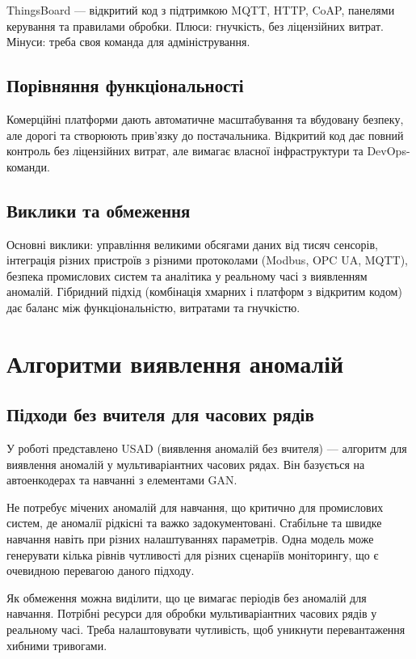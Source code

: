 ThingsBoard --- відкритий код з підтримкою MQTT, HTTP, CoAP, панелями керування та правилами обробки. Плюси: гнучкість, без ліцензійних витрат. Мінуси: треба своя команда для адміністрування.

\subsection{Порівняння функціональності}

Комерційні платформи дають автоматичне масштабування та вбудовану безпеку, але дорогі та створюють прив'язку до постачальника. Відкритий код дає повний контроль без ліцензійних витрат, але вимагає власної інфраструктури та DevOps-команди.

\subsection{Виклики та обмеження}

Основні виклики: управління великими обсягами даних від тисяч сенсорів, інтеграція різних пристроїв з різними протоколами (Modbus, OPC UA, MQTT), безпека промислових систем та аналітика у реальному часі з виявленням аномалій. Гібридний підхід (комбінація хмарних і платформ з відкритим кодом) дає баланс між функціональністю, витратами та гнучкістю.


\section{Алгоритми виявлення аномалій}

\subsection{Підходи без вчителя для часових рядів}

У роботі \cite{audibert2020usad} представлено USAD (виявлення аномалій без вчителя) --- алгоритм для виявлення аномалій у мультиваріантних часових рядах. Він базується на автоенкодерах та навчанні з елементами GAN.

 Не потребує мічених аномалій для навчання, що критично для промислових систем, де аномалії рідкісні та важко задокументовані. Стабільне та швидке навчання навіть при різних налаштуваннях параметрів. Одна модель може генерувати кілька рівнів чутливості для різних сценаріїв моніторингу, що є очевидною перевагою даного підходу.

Як обмеження можна виділити, що це вимагає періодів без аномалій для навчання. Потрібні ресурси для обробки мультиваріантних часових рядів у реальному часі. Треба налаштовувати чутливість, щоб уникнути перевантаження хибними тривогами.

